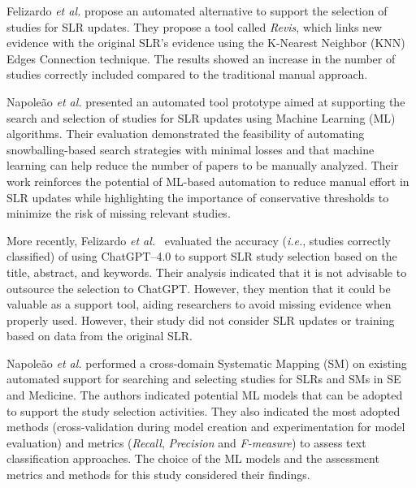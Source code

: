 
Felizardo \textit{et al.} \cite{Felizardo14} propose an automated alternative to support the selection of studies for SLR updates. They propose a tool called \textit{Revis}, which links new evidence with the original SLR's evidence using the K-Nearest Neighbor (KNN) Edges Connection technique. The results showed an increase in the number of studies correctly included compared to the traditional manual approach.

Napoleão \textit{et al.} \cite{minetto2024emerging} presented an automated tool prototype aimed at supporting the search and selection of studies for SLR updates using Machine Learning (ML) algorithms. Their evaluation demonstrated the feasibility of automating snowballing-based search strategies with minimal losses and that machine learning can help reduce the number of papers to be manually analyzed. Their work reinforces the potential of ML-based automation to reduce manual effort in SLR updates while highlighting the importance of conservative thresholds to minimize the risk of missing relevant studies.

More recently, Felizardo \textit{et al.}~\cite{felizardoEtAl2024} evaluated the accuracy (\textit{i.e.}, studies correctly classified) of using ChatGPT–4.0 to support SLR study selection based on the title, abstract, and keywords. Their analysis indicated that it is not advisable to outsource the selection to ChatGPT. However, they mention that it could be valuable as a support tool, aiding researchers to avoid missing evidence when properly used. However, their study did not consider SLR updates or training based on data from the original SLR.

Napoleão \textit{et al.} \cite{Napoleao2021} performed a cross-domain Systematic Mapping (SM) on existing automated support for searching and selecting studies for SLRs and SMs in SE and Medicine. The authors indicated potential ML models that can be adopted to support the study selection activities. They also indicated the most adopted methods (cross-validation during model creation and experimentation for model evaluation) and metrics (\textit{Recall}, \textit{Precision} and \textit{F-measure}) to assess text classification approaches. The choice of the ML models and the assessment metrics and methods for this study considered their findings.


